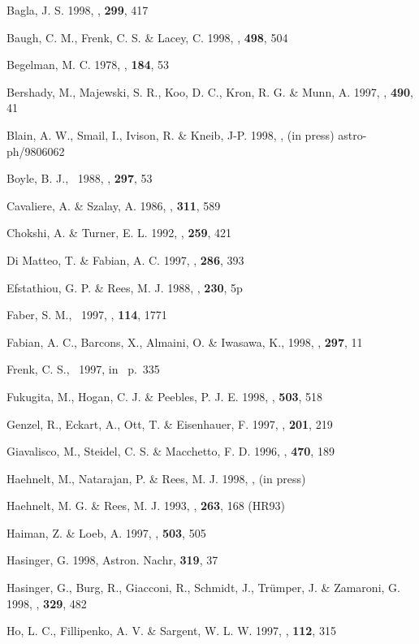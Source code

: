 {{{{{{{{{{{{{{\begin{references}
 Bagla, J. S. 1998, \mnras, {\bf 299}, 417

 Baugh, C. M., Frenk, C. S. \& Lacey, C. 1998, \apj, {\bf 498}, 504

 Begelman, M. C. 1978, \mnras, {\bf 184}, 53

 Bershady, M., Majewski, S. R., Koo, D. C., Kron, R. G. \& Munn, A.
1997, \apj, {\bf 490}, 41

 Blain, A. W., Smail, I., Ivison, R. \& Kneib, J-P. 1998, \mnras, (in
press) astro-ph/9806062

 Boyle, B. J., \etal\ 1988, \mnras, {\bf 297}, 53

 Cavaliere, A. \& Szalay, A. 1986, \apj, {\bf 311}, 589

 Chokshi, A. \& Turner, E. L. 1992, \mnras, {\bf 259}, 421

 Di Matteo, T. \& Fabian, A. C. 1997, \mnras, {\bf 286}, 393

 Efstathiou, G. P. \& Rees, M. J. 1988, \mnras, {\bf 230}, 5p

 Faber, S. M., \etal\ 1997, \aj, {\bf 114}, 1771

 Fabian, A. C., Barcons, X., Almaini, O. \& Iwasawa, K., 1998, \mnras,
{\bf 297}, 11

 Frenk, C. S., \etal\ 1997, in \PersicSalucci\ p.~335

 Fukugita, M., Hogan, C. J. \& Peebles, P. J. E. 1998, \apj, {\bf
503}, 518

 Genzel, R., Eckart, A., Ott, T. \& Eisenhauer, F. 1997, \mnras, {\bf
201}, 219

 Giavalisco, M., Steidel, C. S. \& Macchetto, F. D. 1996, \apj, {\bf
470}, 189

 Haehnelt, M., Natarajan, P. \& Rees, M. J. 1998, \mnras, (in press)

 Haehnelt, M. G. \& Rees, M. J. 1993, \mnras, {\bf 263}, 168 (HR93)

 Haiman, Z. \& Loeb, A. 1997, \apj, {\bf 503}, 505

 Hasinger, G. 1998, Astron. Nachr, {\bf 319}, 37

 Hasinger, G., Burg, R., Giacconi, R., Schmidt, J., Tr\"umper, J. \&
Zamaroni, G. 1998, \aap, {\bf 329}, 482

 Ho, L. C., Fillipenko, A. V. \& Sargent, W. L. W. 1997, \apjs, {\bf
112}, 315


\end{references}}}}}}}}}}}}}}}

